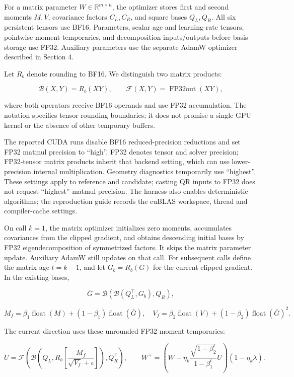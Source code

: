 For a matrix parameter \(W\in\mathbb{R}^{m\times n}\), the optimizer
stores first and second moments \(M,V\), covariance factors \(C_L,C_R\),
and square bases \(Q_L,Q_R\). All six persistent tensors use BF16.
Parameters, scalar age and learning-rate tensors, pointwise moment
temporaries, and decomposition inputs/outputs before basis storage use
FP32. Auxiliary parameters use the separate AdamW
optimizer~\citep{loshchilov2017decoupled} described in
Section 4.

Let \(R_b\) denote rounding to BF16. We distinguish two matrix products:

\[
\mathcal B(X,Y)=R_b(XY),\qquad
\mathcal F(X,Y)=\operatorname{FP32out}(XY),
\]

where both operators receive BF16 operands and use FP32 accumulation.
The notation specifies tensor rounding boundaries; it does not promise a
single GPU kernel or the absence of other temporary buffers.

The reported CUDA runs disable BF16 reduced-precision reductions and set
FP32 matmul precision to ``high''. FP32 denotes tensor and solver
precision; FP32-tensor matrix products inherit that backend setting,
which can use lower-precision internal multiplication. Geometry
diagnostics temporarily use ``highest''. These settings apply to
reference and candidate; casting QR inputs to FP32 does not request
``highest'' matmul precision. The harness also enables deterministic
algorithms; the reproduction guide records the cuBLAS workspace, thread
and compiler-cache settings.

On call \(k=1\), the matrix optimizer initializes zero moments,
accumulates covariances from the clipped gradient, and obtains
descending initial bases by FP32 eigendecomposition of symmetrized
factors. It skips the matrix parameter update. Auxiliary AdamW still
updates on that call. For subsequent calls define the matrix age
\(t=k-1\), and let \(G_b=R_b(G)\) for the current clipped gradient. In
the existing bases,

\[
\bar G=\mathcal B(\mathcal B(Q_L^\top,G_b),Q_R),
\]

\[
M_f=\beta_1\operatorname{float}(M)+(1-\beta_1)\operatorname{float}(\bar G),
\quad
V_f=\beta_2\operatorname{float}(V)+(1-\beta_2)\operatorname{float}(\bar G)^2.
\]

The current direction uses these unrounded FP32 moment temporaries:

\[
U=\mathcal F\!\left(\mathcal B\!\left(Q_L,
 R_b\!\left[\frac{M_f}{\sqrt{V_f}+\epsilon}\right]\right),Q_R^\top\right),
\qquad
W^+=\left(W-\eta_k\frac{\sqrt{1-\beta_2^t}}{1-\beta_1^t}U\right)
 (1-\eta_k\lambda).
\]

